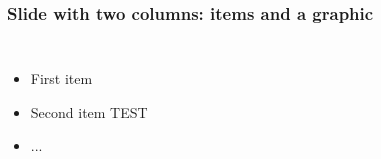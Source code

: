 \documentclass[mathserif]{beamer}
\begin{document}
\begin{frame}
  \frametitle{Slide with two columns: items and a graphic}   
  \begin{columns}[c]
  \column{2in}  %
  \begin{itemize}
  \item<1-> First item
  \item<2-> Second item TEST
  \item<3-> ...
  \end{itemize}
  \column{2.5in}
  \end{columns}
\end{frame}
\end{document}
